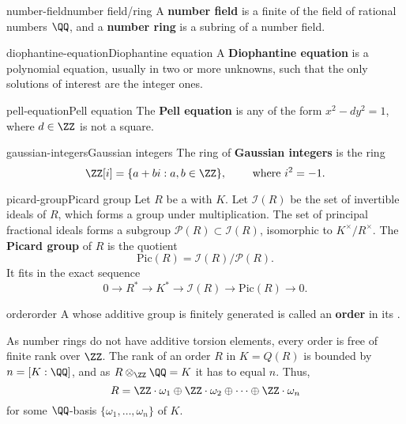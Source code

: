 \begin{topic}{number-field}{number field/ring}
    A \textbf{number field} is a finite  of the field of rational numbers $\QQ$, and a \textbf{number ring} is a subring of a number field.
\end{topic}

\begin{topic}{diophantine-equation}{Diophantine equation}
    A \textbf{Diophantine equation} is a polynomial equation, usually in two or more unknowns, such that the only solutions of interest are the integer ones.
\end{topic}

\begin{topic}{pell-equation}{Pell equation}
    The \textbf{Pell equation} is any  of the form $x^2 - dy^2 = 1$, where $d \in \ZZ$ is not a square.
\end{topic}

\begin{topic}{gaussian-integers}{Gaussian integers}
    The ring of \textbf{Gaussian integers} is the ring
    \[ \ZZ[i] = \{ a + bi : a, b \in \ZZ \}, \qquad \text{ where } i^2 = -1 . \]
\end{topic}

\begin{topic}{picard-group}{Picard group}
    Let $R$ be a  with  $K$. Let $\mathcal{I}(R)$ be the set of invertible ideals of $R$, which forms a group under multiplication. The set of principal fractional ideals forms a subgroup $\mathcal{P}(R) \subset \mathcal{I}(R)$, isomorphic to $K^\times / R^\times$. The \textbf{Picard group} of $R$ is the quotient
    \[ \text{Pic}(R) = \mathcal{I}(R) / \mathcal{P}(R) . \]
    It fits in the exact sequence
    \[ 0 \to R^* \to K^* \to \mathcal{I}(R) \to \text{Pic}(R) \to 0 . \]
\end{topic}

\begin{topic}{order}{order}
    A  whose additive group is finitely generated is called an \textbf{order} in its .
    
    As number rings do not have additive torsion elements, every order is free of finite rank over $\ZZ$. The rank of an order $R$ in $K = Q(R)$ is bounded by $n = [ K : \QQ ]$, and as $R \otimes_\ZZ \QQ = K$ it has to equal $n$. Thus,
    \[ R = \ZZ \cdot \omega_1 \oplus \ZZ \cdot \omega_2 \oplus \cdots \oplus \ZZ \cdot \omega_n \]
    for some $\QQ$-basis $\{ \omega_1, \ldots, \omega_n \}$ of $K$.
\end{topic}

